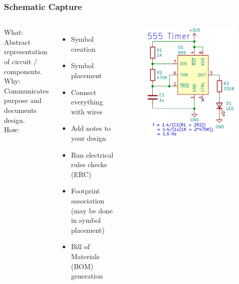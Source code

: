 \documentclass[aspectratio=169, t]{beamer}
\begin{document}
\begin{frame}
\frametitle{Schematic Capture}
\begin{columns}
	What: Abstract representation of circuit / components.\\
	Why: Communicates purpose and documents design.\\
	How:
	\begin{itemize}
		\item Symbol creation
		\item Symbol placement
		\item Connect everything with wires
		\item Add notes to your design
		\item Run electrical rules checks (ERC)
		\item Footprint association (may be done in symbol placement)
		\item Bill of Materials (BOM) generation 
	\end{itemize}
	
	\vspace{-8mm}
	\begin{figure}
		\includegraphics[width=\linewidth]{images/555-schematic-snip.png}
	\end{figure}
\end{columns}
\end{frame}
\end{document}
